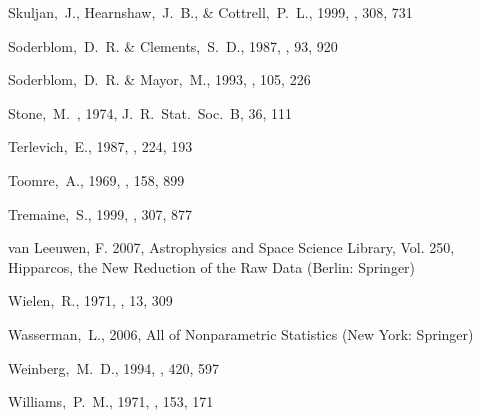 \begin{thebibliography}{99}
  Skuljan,~J., Hearnshaw,~J.~B., \& Cottrell,~P.~L., 1999, \mnras, 308, 731

  Soderblom,~D.~R. \& Clements,~S.~D., 1987, \aj, 93, 920

  Soderblom,~D.~R. \& Mayor,~M., 1993,
  \aj, 105, 226

  Stone,~M.~, 1974,
  J.~R.~Stat.~Soc.~B, 36, 111

  Terlevich,~E., 1987,
  \mnras, 224, 193

  Toomre,~A., 1969,
  \apj, 158, 899

  Tremaine,~S., 1999,
  \mnras, 307, 877

 {van Leeuwen}, F. 2007,
Astrophysics and Space Science Library, Vol. 250, {Hipparcos, the New
Reduction of the Raw Data} (Berlin: {Springer})

  Wielen,~R., 1971, \aap, 13, 309

  Wasserman,~L., 2006,
  All of Nonparametric Statistics (New York: Springer)

  Weinberg,~M.~D., 1994,
  \apj, 420, 597

  Williams,~P.~M., 1971, \mnras, 153, 171


\end{thebibliography}
